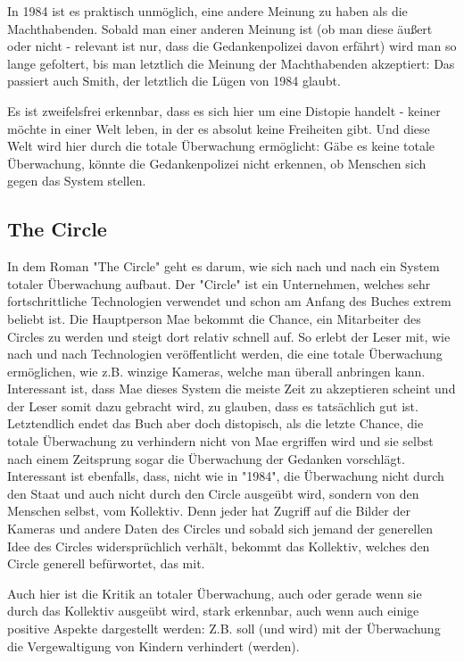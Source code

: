 \documentclass{article}
\begin{document}
In 1984 ist es praktisch unmöglich, eine andere Meinung zu haben als die Machthabenden. Sobald man einer anderen Meinung ist (ob man diese äußert oder nicht - relevant ist nur, dass die Gedankenpolizei davon erfährt) wird man so lange gefoltert, bis man letztlich die Meinung der Machthabenden akzeptiert: Das passiert auch Smith, der letztlich die Lügen von 1984 glaubt.

Es ist zweifelsfrei erkennbar, dass es sich hier um eine Distopie handelt - keiner möchte in einer Welt leben, in der es absolut keine Freiheiten gibt. Und diese Welt wird hier durch die totale Überwachung ermöglicht: Gäbe es keine totale Überwachung, könnte die Gedankenpolizei nicht erkennen, ob Menschen sich gegen das System stellen.

\subsection{The Circle\autocite{TheCircle}}
In dem Roman "The Circle" geht es darum, wie sich nach und nach ein System totaler Überwachung aufbaut. Der "Circle" ist ein Unternehmen, welches sehr fortschrittliche Technologien verwendet und schon am Anfang des Buches extrem beliebt ist. Die Hauptperson Mae bekommt die Chance, ein Mitarbeiter des Circles zu werden und steigt dort relativ schnell auf. So erlebt der Leser mit, wie nach und nach Technologien veröffentlicht werden, die eine totale Überwachung ermöglichen, wie z.B. winzige Kameras, welche man überall anbringen kann. Interessant ist, dass Mae dieses System die meiste Zeit zu akzeptieren scheint und der Leser somit dazu gebracht wird, zu glauben, dass es tatsächlich gut ist. Letztendlich endet das Buch aber doch distopisch, als die letzte Chance, die totale Überwachung zu verhindern nicht von Mae ergriffen wird und sie selbst nach einem Zeitsprung sogar die Überwachung der Gedanken vorschlägt. Interessant ist ebenfalls, dass, nicht wie in "1984", die Überwachung nicht durch den Staat und auch nicht durch den Circle ausgeübt wird, sondern von den Menschen selbst, vom Kollektiv. Denn jeder hat Zugriff auf die Bilder der Kameras und andere Daten des Circles und sobald sich jemand der generellen Idee des Circles widersprüchlich verhält, bekommt das Kollektiv, welches den Circle generell befürwortet, das mit.

Auch hier ist die Kritik an totaler Überwachung, auch oder gerade wenn sie durch das Kollektiv ausgeübt wird, stark erkennbar, auch wenn auch einige positive Aspekte dargestellt werden: Z.B. soll (und wird) mit der Überwachung die Vergewaltigung von Kindern verhindert (werden).
\end{document}
